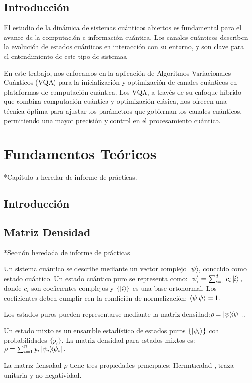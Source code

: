 \documentclass[11pt, spanish, letterpage]{report} %
\newcommand{\1}{\mathbb{1}}
\begin{document}
\section{Introducción}

El estudio de la dinámica de sistemas cuánticos abiertos es fundamental para el avance de la computación e información cuántica. Los canales cuánticos describen la evolución de estados cuánticos en  interacción con su entorno, y son clave para el entendimiento de este tipo de sistemas.

En este trabajo, nos enfocamos en la aplicación de Algoritmos Variacionales Cuánticos (VQA) para la inicialización y optimización de canales cuánticos en plataformas de computación cuántica. Los VQA, a través de su enfoque híbrido que combina computación cuántica y optimización clásica, nos ofrecen una técnica óptima para ajustar los parámetros que gobiernan los canales cuánticos, permitiendo una mayor precisión y control en el procesamiento cuántico.
\chapter{Fundamentos Teóricos}
*Capítulo a heredar de informe de prácticas. 
\section{Introducción}
\section{Matriz Densidad}
*Sección heredada de informe de prácticas

Un sistema cuántico se describe mediante un vector complejo $\ket{\psi}$, conocido como estado cuántico. Un estado cuántico puro se representa como:
$
\ket{\psi} = \sum_{i=1}^{d} c_i \ket{i},
$
donde $c_i$ son coeficientes complejos y $\{\ket{i}\}$ es una base ortonormal. Los coeficientes deben cumplir con la condición de normalización:
$
\braket{\psi}{\psi}=1.
$

 Los estados puros pueden representarse mediante la matriz densidad:$\rho = \ketbra{\psi}.$.  
 
 Un estado mixto es un ensamble estadístico de estados puros $\{\ket{\psi_i}\}$ con probabilidades $\{p_i\}$. La matriz densidad para estados mixtos es:$\rho = \sum_{i=1}^{n} p_i \ketbra{\psi_i}.$

La matriz densidad $\rho$ tiene tres propiedades principales: Hermiticidad , traza unitaria y no negatividad.
\end{document}
